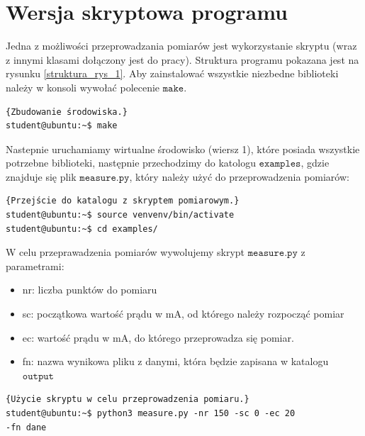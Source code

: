 \section{Wersja skryptowa programu}
Jedna z możliwości przeprowadzania pomiarów jest wykorzystanie skryptu (wraz z innymi klasami dołączony jest do pracy).
Struktura programu pokazana jest na rysunku \ref{struktura_rys_1}. Aby zainstalować wszystkie niezbedne biblioteki należy
w konsoli wywołać polecenie $\mathtt{make}$.
\begin{lstlisting}[style=Bash]{Zbudowanie środowiska.}
student@ubuntu:~$ make
\end{lstlisting}
Nastepnie uruchamiamy wirtualne środowisko (wiersz 1), które posiada wszystkie potrzebne biblioteki, następnie
przechodzimy do katologu $\mathtt{examples}$, gdzie znajduje się plik $\mathtt{measure.py}$, który należy użyć do
przeprowadzenia pomiarów:
\begin{lstlisting}[style=Bash]{Przejście do katalogu z skryptem pomiarowym.}
student@ubuntu:~$ source venvenv/bin/activate
student@ubuntu:~$ cd examples/
\end{lstlisting}
W celu przeprawadzenia pomiarów wywolujemy skrypt $\mathtt{measure.py}$ z parametrami:
\begin{itemize}
\item nr: liczba punktów do pomiaru
\item sc: początkowa wartość prądu w mA, od którego należy rozpocząć pomiar
\item ec: wartość prądu w mA, do którego przeprowadza się pomiar.
\item fn: nazwa wynikowa pliku z danymi, która będzie zapisana w katalogu $\mathtt{output}$
\end{itemize}
\begin{lstlisting}[style=Bash]{Użycie skryptu w celu przeprowadzenia pomiaru.}
student@ubuntu:~$ python3 measure.py -nr 150 -sc 0 -ec 20
-fn dane
\end{lstlisting}
